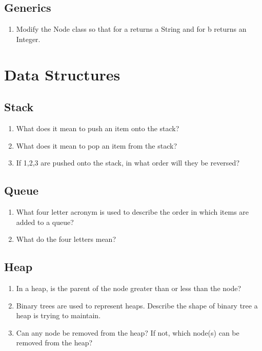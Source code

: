 \documentclass{article}
\begin{document}
	\subsection{Generics}
	\begin{enumerate}
		\item Modify the Node class so that  for \var a
		returns a String and  for \var b returns an
		Integer.
	\end{enumerate}

\section{Data Structures}
	\subsection{Stack}
		\begin{enumerate}
			\item What does it mean to push an item onto the stack?
			\item What does it mean to pop an item from the stack?
			\item If 1,2,3 are pushed onto the stack, in what order
			will they be reversed?
		\end{enumerate}
	\subsection{Queue}
		\begin{enumerate}
			\item What four letter acronym is used to describe the
			order in which items are added to a queue?
			\item What do the four letters mean?
		\end{enumerate}
	\subsection{Heap}
		\begin{enumerate}
			\item In a heap, is the parent of the node greater than
			or less than the node?
			\item Binary trees are used to represent heaps.
			Describe the shape of binary tree a heap is trying to
			maintain.
			\item Can any node be removed from the heap? If not,
			which node(s) can be removed from the heap?
		\end{enumerate}
\end{document}
